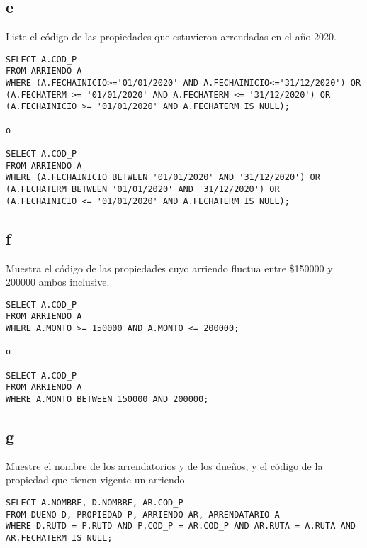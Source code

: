 \documentclass{templateNote}
\begin{document}
\subsection{e}
\indent
Liste el código de las propiedades que estuvieron arrendadas en el año 2020.
\begin{tcolorbox}
    [colback=gray!5!white,colframe=gray!75!black,fonttitle=\bfseries,title=SQL]
    \begin{sqlcode}
    \end{sqlcode}
    \begin{verbatim}
SELECT A.COD_P
FROM ARRIENDO A
WHERE (A.FECHAINICIO>='01/01/2020' AND A.FECHAINICIO<='31/12/2020') OR 
(A.FECHATERM >= '01/01/2020' AND A.FECHATERM <= '31/12/2020') OR 
(A.FECHAINICIO >= '01/01/2020' AND A.FECHATERM IS NULL);

o

SELECT A.COD_P
FROM ARRIENDO A
WHERE (A.FECHAINICIO BETWEEN '01/01/2020' AND '31/12/2020') OR
(A.FECHATERM BETWEEN '01/01/2020' AND '31/12/2020') OR
(A.FECHAINICIO <= '01/01/2020' AND A.FECHATERM IS NULL);
    \end{verbatim}
\end{tcolorbox}

\newpage
\subsection{f}
\indent
Muestra el código de las propiedades cuyo arriendo fluctua entre \$150000 y 200000 ambos inclusive.
\begin{tcolorbox}
    [colback=gray!5!white,colframe=gray!75!black,fonttitle=\bfseries,title=SQL]
    \begin{sqlcode}
    \end{sqlcode}
    \begin{verbatim}
SELECT A.COD_P
FROM ARRIENDO A
WHERE A.MONTO >= 150000 AND A.MONTO <= 200000;

o

SELECT A.COD_P
FROM ARRIENDO A
WHERE A.MONTO BETWEEN 150000 AND 200000;
    \end{verbatim}
\end{tcolorbox}

\subsection{g}
\indent
Muestre el nombre de los arrendatorios y de los dueños, y el código de la propiedad que tienen vigente un arriendo.
\begin{tcolorbox}
    [colback=gray!5!white,colframe=gray!75!black,fonttitle=\bfseries,title=SQL]
    \begin{sqlcode}
    \end{sqlcode}
    \begin{verbatim}
SELECT A.NOMBRE, D.NOMBRE, AR.COD_P 
FROM DUENO D, PROPIEDAD P, ARRIENDO AR, ARRENDATARIO A
WHERE D.RUTD = P.RUTD AND P.COD_P = AR.COD_P AND AR.RUTA = A.RUTA AND 
AR.FECHATERM IS NULL;
    \end{verbatim}
\end{tcolorbox}
\end{document}
